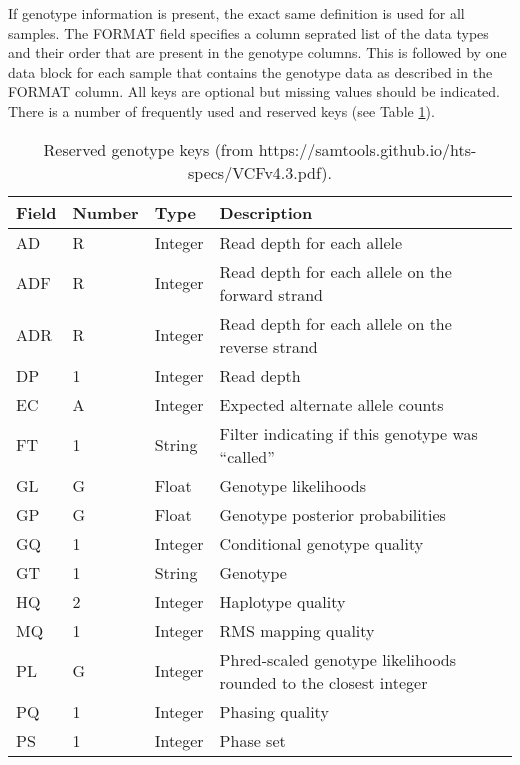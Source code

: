 If genotype information is present, the exact same definition is used for all samples. The FORMAT field specifies a column seprated list of the data types and their order that are present in the genotype columns. This is followed by one data block for each sample that contains the genotype data as described in the FORMAT column. All keys are optional but missing values should be indicated. There is a number of frequently used and reserved keys (see Table \ref{tab:reserved-genotypes}).

\begin{table}[H]
    \centering
      \begin{tabularx}{\textwidth}{ | p{2.5cm} | p{1.5cm} | p{1.5cm} | X | }
        \toprule
        Field		& Number	& Type		& Description \\ 
        \midrule
        AD		& R		& Integer	& Read depth for each allele \\
        ADF		& R		& Integer	& Read depth for each allele on the forward strand \\
        ADR		& R		& Integer	& Read depth for each allele on the reverse strand \\
        DP		& 1		& Integer	& Read depth \\
        EC		& A		& Integer	& Expected alternate allele counts \\
        FT		& 1		& String	& Filter indicating if this genotype was ``called'' \\
        GL		& G		& Float		& Genotype likelihoods \\
        GP		& G		& Float		& Genotype posterior probabilities \\
        GQ		& 1		& Integer	& Conditional genotype quality \\
        GT		& 1		& String	& Genotype \\
        HQ		& 2		& Integer	& Haplotype quality \\
        MQ		& 1		& Integer	& RMS mapping quality \\
        PL		& G		& Integer	& Phred-scaled genotype likelihoods rounded to the closest integer \\
        PQ		& 1		& Integer	& Phasing quality \\
        PS		& 1		& Integer	& Phase set \\
        \bottomrule
    \end{tabularx}
    \caption{Reserved genotype keys (from https://samtools.github.io/hts-specs/VCFv4.3.pdf).}
    \label{tab:reserved-genotypes}
  \end{table}

